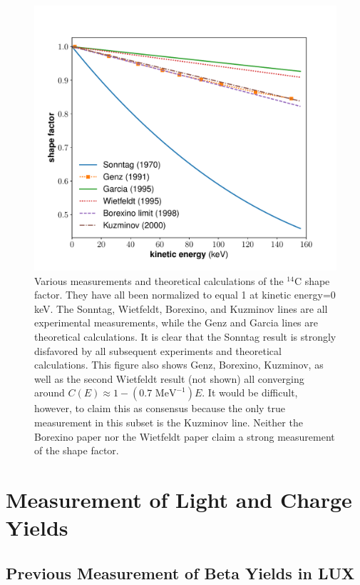 \begin{figure}[h!]
\centering
\includegraphics[width=\textwidth]{Figures/ShapeFac_compare.pdf}
\caption{Various measurements and theoretical calculations of the $^{14}$C shape factor. They have all been normalized to equal 1 at kinetic energy=0 keV. The Sonntag\cite{C14_Sonntag}, Wietfeldt\cite{C14_Wietfeldt}, Borexino\cite{C14_Borexino}, and Kuzminov\cite{C14_Kuzminov} lines are all experimental measurements, while the Genz\cite{C14_Genz} and Garcia\cite{C14_Garcia} lines are theoretical calculations. It is clear that the Sonntag result is strongly disfavored by all subsequent experiments and theoretical calculations. This figure also shows Genz, Borexino, Kuzminov, as well as the second Wietfeldt result (not shown) all converging around $C(E)\approx 1-(0.7 \text{ \ MeV}^{-1})E$. It would be difficult, however, to claim this as consensus because the only true measurement in this subset is the Kuzminov line. Neither the Borexino paper nor the Wietfeldt paper claim a strong measurement of the shape factor.} 
\label{fig:C14_shape}
\end{figure}



\section{Measurement of Light and Charge Yields}
\subsection{Previous Measurement of Beta Yields in LUX}



